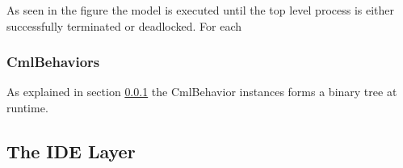 \documentclass[a4paper, 10pt]{include/compassreport}   %
\begin{document}
As seen in the figure the model is executed until the top level
process is either successfully terminated or deadlocked. For each 

\subsubsection{CmlBehaviors}

As explained in section \ref{} the CmlBehavior instances forms a binary tree at runtime. 


\subsection{The IDE Layer}
\label{sec:user_interface}

\newpage

 
\label{ch:bib} %
\end{document}
